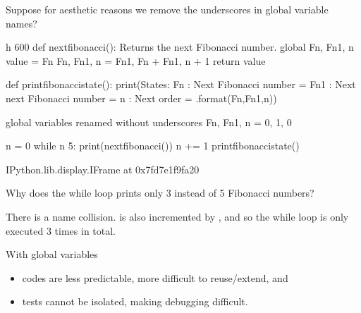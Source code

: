 \documentclass[letterpaper,10pt,english]{sphinxmanual}
\begin{document}

Suppose for aesthetic reasons we remove the underscores in global variable names?

\begin{sphinxVerbatim}[commandchars=\\\{\}]
 \PYGZhy{}h 600
def next\PYGZus{}fibonacci():
    \PYGZsq{}\PYGZsq{}\PYGZsq{}Returns the next Fibonacci number.\PYGZsq{}\PYGZsq{}\PYGZsq{}
    global Fn, Fn1, n
    value = Fn
    Fn, Fn1, n = Fn1, Fn + Fn1, n + 1
    return value

def print\PYGZus{}fibonacci\PYGZus{}state():
    print(\PYGZsq{}\PYGZsq{}\PYGZsq{}States:
    Fn  : Next Fibonacci number      = \PYGZob{}\PYGZcb{}
    Fn1 : Next next Fibonacci number = \PYGZob{}\PYGZcb{}
    n   : Next order                 = \PYGZob{}\PYGZcb{}\PYGZsq{}\PYGZsq{}\PYGZsq{}.format(Fn,Fn1,n))

\PYGZsh{} global variables renamed without underscores
Fn, Fn1, n = 0, 1, 0

n = 0
while n \PYGZlt{} 5:
    print(next\PYGZus{}fibonacci())
    n += 1
print\PYGZus{}fibonacci\PYGZus{}state()
\end{sphinxVerbatim}

\begin{sphinxVerbatim}[commandchars=\\\{\}]
\PYGZlt{}IPython.lib.display.IFrame at 0x7fd7e1f9fa20\PYGZgt{}
\end{sphinxVerbatim}

 Why does the while loop prints only 3 instead of 5 Fibonacci numbers?

There is a name collision.  is also incremented by , and so the while loop is only executed 3 times in total.

With global variables
\begin{itemize}
\item {} 
codes are less predictable, more difficult to reuse/extend, and

\item {} 
tests cannot be isolated, making debugging difficult.

\end{itemize}

\end{document}
